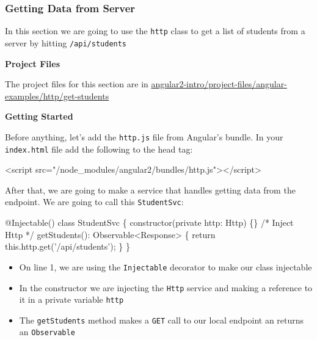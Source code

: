 \documentclass[12pt,]{article}
\newenvironment{Shaded}{}{}
\newcommand{\KeywordTok}[1]{\textcolor[rgb]{0.00,0.00,1.00}{{#1}}}
\newcommand{\StringTok}[1]{\textcolor[rgb]{0.00,0.50,0.50}{{#1}}}
\newcommand{\CommentTok}[1]{\textcolor[rgb]{0.00,0.50,0.00}{{#1}}}
\newcommand{\OtherTok}[1]{\textcolor[rgb]{1.00,0.25,0.00}{{#1}}}
\newcommand{\FunctionTok}[1]{{#1}}
\newcommand{\NormalTok}[1]{{#1}}
\providecommand{\tightlist}{%
  \setlength{\itemsep}{0pt}\setlength{\parskip}{0pt}}
\begin{document}
\subsubsection{Getting Data from Server}\label{getting-data-from-server}

In this section we are going to use the \texttt{http} class to get a
list of students from a server by hitting \texttt{/api/students}

\textbf{Project Files}

The project files for this section are in
\href{https://github.com/st32lth/angular2-intro/tree/master/project-files/angular-examples/http/get-students}{angular2-intro/project-files/angular-examples/http/get-students}

\textbf{Getting Started}

Before anything, let's add the \texttt{http.js} file from Angular's
bundle. In your \texttt{index.html} file add the following to the head
tag:

\begin{Shaded}
\begin{Highlighting}[numbers=left,,]
\KeywordTok{<script}\OtherTok{ src=}\StringTok{"/node_modules/angular2/bundles/http.js"}\KeywordTok{></script>}
\end{Highlighting}
\end{Shaded}

After that, we are going to make a service that handles getting data
from the endpoint. We are going to call this \texttt{StudentSvc}:

\begin{Shaded}
\begin{Highlighting}[numbers=left,,]
\FunctionTok{@Injectable}\NormalTok{()}
\KeywordTok{class} \NormalTok{StudentSvc \{}
  \FunctionTok{constructor}\NormalTok{(}\KeywordTok{private} \NormalTok{http: Http) \{\} }\CommentTok{/* Inject Http */}
  \FunctionTok{getStudents}\NormalTok{(): Observable<Response> \{}
    \KeywordTok{return} \KeywordTok{this}\NormalTok{.}\FunctionTok{http}\NormalTok{.}\FunctionTok{get}\NormalTok{('/api/students');}
  \NormalTok{\}}
\NormalTok{\}}
\end{Highlighting}
\end{Shaded}

\begin{itemize}
\tightlist
\item
  On line 1, we are using the \texttt{Injectable} decorator to make our
  class injectable
\item
  In the constructor we are injecting the \texttt{Http} service and
  making a reference to it in a private variable \texttt{http}
\item
  The \texttt{getStudents} method makes a \texttt{GET} call to our local
  endpoint an returns an \texttt{Observable}
\end{itemize}
\end{document}
